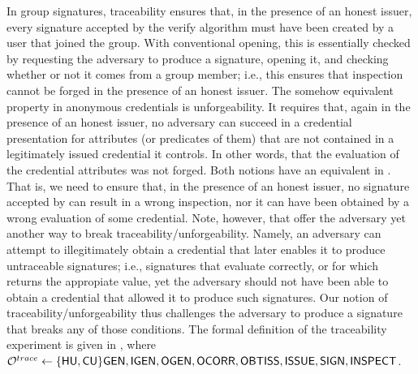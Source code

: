 In group signatures, traceability ensures that, in the presence of an honest
issuer, every signature accepted by the verify algorithm must have been created
by a user that joined the group.  With conventional opening, this is essentially
checked by requesting the adversary to produce a signature, opening it, and
checking whether or not it comes from a group member; i.e., this ensures that
inspection cannot be forged in the presence of an honest issuer.
%
The somehow equivalent property in anonymous credentials is unforgeability. It
requires that, again in the presence of an honest issuer, no adversary can
succeed in a credential presentation for attributes (or predicates of them) that
are not contained in a legitimately issued credential it controls. In other
words, that the evaluation of the credential attributes was not forged.
%
Both notions have an equivalent in \UAS. That is, we need to ensure that, in the
presence of an honest issuer, no signature accepted by \Verify can result in a
wrong inspection, nor it can have been obtained by a wrong evaluation of some
credential. Note, however, that \UAS offer the adversary yet another way to
break traceability/unforgeability. Namely, an adversary can attempt to
illegitimately obtain a credential that later enables it to produce untraceable
signatures; i.e., signatures that evaluate correctly, or for which \Inspect
returns the appropiate value, yet the adversary should not have been able to
obtain a credential that allowed it to produce such signatures. Our notion of
traceability/unforgeability thus challenges the adversary to produce a signature
that breaks any of those conditions. The formal
definition of the traceability experiment is given in ,
where $\mathcal{O}^{trace} \gets \lbrace\mathsf{HU},\mathsf{CU}\rbrace\mathsf{GEN},\mathsf{IGEN},\mathsf{OGEN},\mathsf{OCORR},\mathsf{OBTISS},
\mathsf{ISSUE},\mathsf{SIGN},\mathsf{INSPECT}$.

